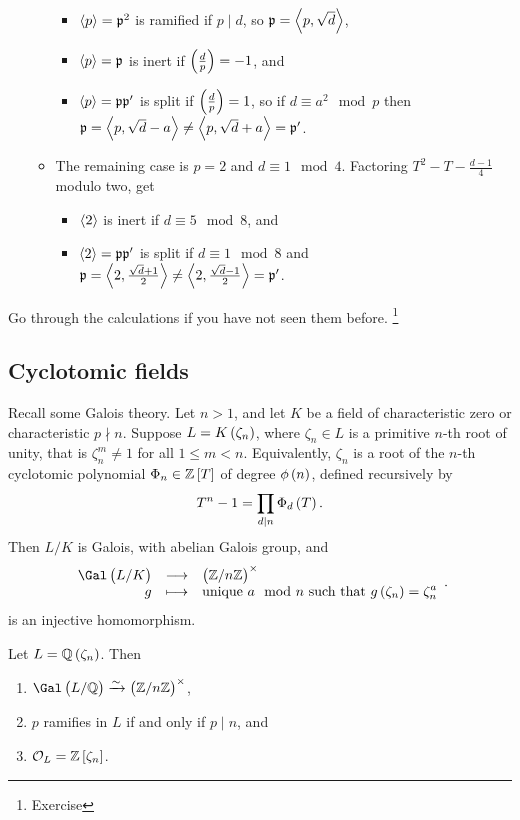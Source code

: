 \begin{itemize}
\begin{itemize}
\begin{itemize}
\item $ \left\langle p \right\rangle = \mathfrak{p}^2 $ is ramified if $ p \mid d $, so $ \mathfrak{p} = \left\langle p, \sqrt{d} \right\rangle $,
\item $ \left\langle p \right\rangle = \mathfrak{p}  $ is inert if $ \br{\tfrac{d}{p}} = -1 $, and
\item $ \left\langle p \right\rangle = \mathfrak{p}\mathfrak{p}' $ is split if $ \br{\tfrac{d}{p}} = 1 $, so if $ d \equiv a^2 \mod p $ then $ \mathfrak{p} = \left\langle p, \sqrt{d} - a \right\rangle \ne \left\langle p, \sqrt{d} + a \right\rangle = \mathfrak{p}' $.
\end{itemize}
\item The remaining case is $ p = 2 $ and $ d \equiv 1 \mod 4 $. Factoring $ T^2 - T - \tfrac{d - 1}{4} $ modulo two, get
\begin{itemize}
\item $ \left\langle 2 \right\rangle $ is inert if $ d \equiv 5 \mod 8 $, and
\item $ \left\langle 2 \right\rangle = \mathfrak{p}\mathfrak{p}' $ is split if $ d \equiv 1 \mod 8 $ and $ \mathfrak{p} = \left\langle 2, \tfrac{\sqrt{d} + 1}{2} \right\rangle \ne \left\langle 2, \tfrac{\sqrt{d} - 1}{2} \right\rangle = \mathfrak{p}' $.
\end{itemize}
\end{itemize}
\end{itemize}
Go through the calculations if you have not seen them before. \footnote{Exercise}

\subsection{Cyclotomic fields}

Recall some Galois theory. Let $ n > 1 $, and let $ K $ be a field of characteristic zero or characteristic $ p \nmid n $. Suppose $ L = K\br{\zeta_n} $, where $ \zeta_n \in L $ is a primitive $ n $-th root of unity, that is $ \zeta_n^m \ne 1 $ for all $ 1 \le m < n $. Equivalently, $ \zeta_n $ is a root of the $ n $-th cyclotomic polynomial $ \Phi_n \in \ZZ\sbr{T} $ of degree $ \phi\br{n} $, defined recursively by
$$ T^n - 1 = \prod_{d \mid n} \Phi_d\br{T}. $$
Then $ L / K $ is Galois, with abelian Galois group, and
$$ \function{\Gal\br{L / K}}{\br{\ZZ / n\ZZ}^\times}{g}{\text{unique} \ a \mod n \ \text{such that} \ g\br{\zeta_n} = \zeta_n^a}. $$
is an injective homomorphism.

\pagebreak

\begin{theorem}
\label{thm:4.1}
Let $ L = \QQ\br{\zeta_n} $. Then
\begin{enumerate}
\item $ \Gal\br{L / \QQ} \xrightarrow{\sim} \br{\ZZ / n\ZZ}^\times $,
\item $ p $ ramifies in $ L $ if and only if $ p \mid n $, and
\item $ \OOO_L = \ZZ\sbr{\zeta_n} $.
\end{enumerate}
\end{theorem}

